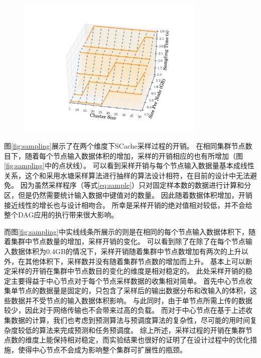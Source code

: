 \begin{figure}[!htp]
	\centering
	\includegraphics[width=0.8\textwidth]{../../PPoPP-2018/fig/sampling.pdf}
\end{figure}

图\ref{fig:sampling}展示了在两个维度下SCache采样过程的开销。
在相同集群节点数目下，随着每个节点输入数据体积的增加，采样的开销相应的也有所增加（图\ref{fig:sampling}中的点状线）。
可以看到采样开销与每个节点输入数据量基本成线性关系，这个和采用水塘采样算法进行抽样的算法设计相符，在目前的设计中无法避免。
因为虽然采样程序（等式\ref{eq:sample}）只对固定样本数的数据进行计算和分区，但是仍然需要统计输入数据中键值对的数量。
因此随着数据体积增加，开销接近线性的增长也与设计相吻合。
所幸是采样开销的绝对值相对较低，并不会给整个DAG应用的执行带来很大影响。

而图\ref{fig:sampling}中实线线条所展示的则是在相同的每个节点输入数据体积下，随着集群中节点数量的增加，采样开销的变化。
可以看到除了在除了在每个节点输入数据体积为0.4GB的情况下，采样开销随着集群中节点数增加有两次的上升以外，在其他体积下，采样数并没有随着集群节点数的增加而上升。
基本上可以断定采样的开销在集群中节点数目的变化的维度是相对稳定的。
此处采样开销的稳定主要得益于中心节点对于每个节点采样数据的收集相对简单。
首先中心节点收集单节点的数据量是固定的，只包含了采样后的输出数据分布和改输入的体积，这些数据并不受节点的输入数据体积影响。
与此同时，由于单节点所需上传的数据较少，因此对于网络传输也不会带来过高的负载。
而对于中心节点在基于上述收集数据的计算，我们也考虑到预测算法与预调度算法的复杂性，尽可能的用时间复杂度较低的算法来完成预测和任务预调度。
综上所述，采样过程的开销在集群节点数的维度上能保持相对稳定，而实验结果也很好的证明了在设计过程中的优化措施，使得中心节点不会成为影响整个集群可扩展性的瓶颈。

